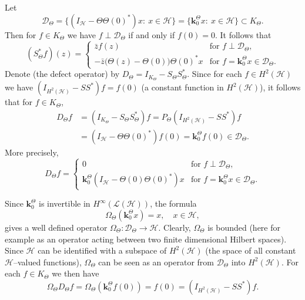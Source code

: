 \documentclass[11pt]{amsart}
\numberwithin{equation}{section}
\newcommand{\hsp}{\mathcal{H}}
\newcommand{\oL }{\mathcal{L}(\hsp) }
\newcommand{\ke}{{\mathbf{k}}}
\theoremstyle{definition}
\numberwithin{equation}{section}
\begin{document}
Let $$\mathcal{D}_{\Theta}=\{(I_{\hsp}-\Theta\Theta(0)^*)x:\ x\in\hsp\}=\{\ke_{0}^{\Theta}x:\ x\in\hsp\}\subset K_{\Theta}.$$
Then for $f\in K_{\Theta}$ we have $f\perp \mathcal{D}_{\Theta}$ if and only if $f(0)=0$.
It follows that
$$(S_{\Theta}^*f)(z)=\left\{\begin{array}{cl}
\bar z f(z)&\text{for }f\perp\mathcal{D}_{\Theta},\\
-\bar z\big(\Theta(z)-\Theta(0)\big)\Theta(0)^*x&\text{for }f=\ke_{0}^{\Theta}x\in\mathcal{D}_{\Theta}.
\end{array}\right.$$
Denote (the defect operator) by $D_{\Theta}=I_{K_{\Theta}}-S_{\Theta}S_{\Theta}^*.$
Since for each $f\in H^2(\hsp)$ we have $(I_{H^2(\hsp)}-SS^*)f=f(0)$ (a constant function in $H^2(\hsp)$), it follows that for $f\in K_{\Theta}$,
\begin{equation}\label{ect}
\begin{split}
D_{\Theta}f&=(I_{K_{\Theta}}-S_{\Theta}S_{\Theta}^*)f=P_{\Theta}(I_{H^2(\hsp)}-SS^*)f\\
&=(I_{\hsp}-\Theta\Theta(0)^*)f(0)=\ke_{0}^{\Theta}f(0)\in \mathcal{D}_{\Theta}.
\end{split}
\end{equation}
More precisely,
$$D_{\Theta}f=\left\{\begin{array}{cl}
0&\text{for }f\perp\mathcal{D}_{\Theta},\\
\ke_{0}^{\Theta}(I_{\hsp}-\Theta(0)\Theta(0)^*)x&\text{for }f=\ke_{0}^{\Theta}x\in\mathcal{D}_{\Theta}.
\end{array}\right.$$

Since $\ke_{0}^{\Theta}$ is invertible in $H^{\infty}(\oL)$, the formula
\begin{equation*}
\Omega_{\Theta}(\ke_{0}^{\Theta}x)=x,\quad x\in\hsp,
\end{equation*}
gives a well defined operator $\Omega_{\Theta}:\mathcal{D}_{\Theta}\to\hsp$. Clearly, $\Omega_{\Theta}$ is bounded (here for example as an operator acting between two finite dimensional Hilbert spaces). Since $\hsp$ can be identified with a subspace of $H^2(\hsp)$ (the space of all constant $\hsp$--valued functions), $\Omega_{\Theta}$ can be seen as an operator from $\mathcal{D}_{\Theta}$ into $H^2(\hsp)$. For each $f\in K_{\Theta}$ we then have
\begin{equation}
\label{wyk1}
\Omega_{\Theta}D_{\Theta}f=\Omega_{\Theta}(\ke_{0}^{\Theta}f(0))=f(0)=(I_{H^2(\hsp)}-SS^*)f.
\end{equation}
\end{document}
